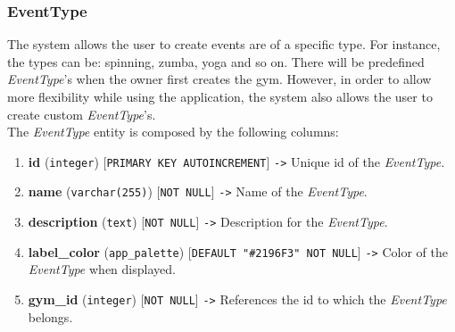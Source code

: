 \documentclass[a4paper, 12pt, oneside]{book}
\begin{document}
\subsubsection{EventType}
The system allows the user to create events are of a specific type. For instance, the types can be: spinning, zumba, yoga and so on. There will be predefined \emph{EventType}'s when the owner first creates the gym. However, in order to allow more flexibility while using the application, the system also allows the user to create custom \emph{EventType}'s.
\\[8pt]
The \emph{EventType} entity is composed by the following columns:
\begin{enumerate}[label = -]
	\item \textbf{id} (\texttt{integer}) [\texttt{PRIMARY KEY AUTOINCREMENT}] \texttt{->} Unique id of the \emph{EventType}.
	\item \textbf{name} (\texttt{varchar(255)}) [\texttt{NOT NULL}] \texttt{->} Name of the \emph{EventType}.
	\item \textbf{description} (\texttt{text}) [\texttt{NOT NULL}] \texttt{->} Description for the \emph{EventType}.
	\item \textbf{label\_color} (\texttt{app\_palette}) [\texttt{DEFAULT "\#2196F3" NOT NULL}] \texttt{->} Color of the \emph{EventType} when displayed.
	\item \textbf{gym\_id} (\texttt{integer}) [\texttt{NOT NULL}] \texttt{->} References the id to which the \emph{EventType} belongs.
\end{enumerate}
\end{document}
